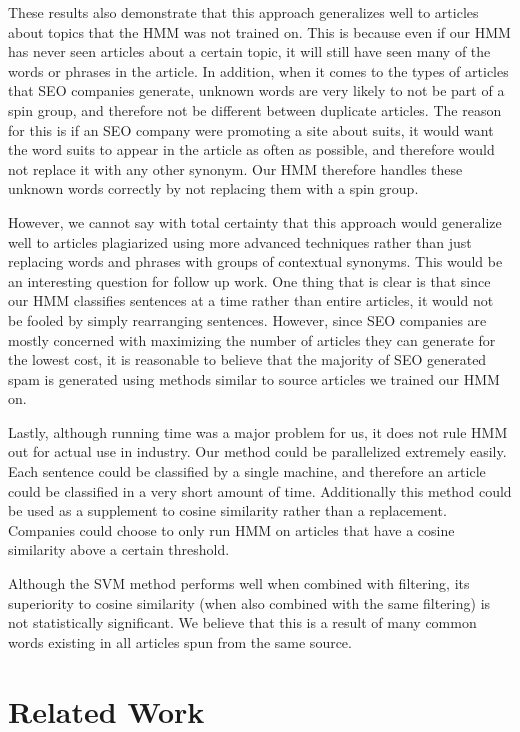 \documentclass[11pt,letterpaper,oneside, titlepage]{scrartcl}
\begin{document}
These results also demonstrate that this approach generalizes well to articles about topics that the HMM was not trained on. This is because even if our HMM has never seen articles about a certain topic, it will still have seen many of the words or phrases in the article. In addition, when it comes to the types of articles that SEO companies generate, unknown words are very likely to not be part of a spin group, and therefore not be different between duplicate articles. The reason for this is if an SEO company were promoting a site about suits, it would want the word suits to appear in the article as often as possible, and therefore would not replace it with any other synonym. Our HMM therefore handles these unknown words correctly by not replacing them with a spin group. 

However, we cannot say with total certainty that this approach would generalize well to articles plagiarized using more advanced techniques rather than just replacing words and phrases with groups of contextual synonyms. This would be an interesting question for follow up work. One thing that is clear is that since our HMM classifies sentences at a time rather than entire articles, it would not be fooled by simply rearranging sentences. However, since SEO companies are mostly concerned with maximizing the number of articles they can generate for the lowest cost, it is reasonable to believe that the majority of SEO generated spam is generated using methods similar to source articles we trained our HMM on.

Lastly, although running time was a major problem for us, it does not rule HMM out for actual use in industry. Our method could be parallelized extremely easily. Each sentence could be classified by a single machine, and therefore an article could be classified in a very short amount of time. Additionally this method could be used as a supplement to cosine similarity rather than a replacement. Companies could choose to only run HMM on articles that have a cosine similarity above a certain threshold.

Although the SVM method performs well when combined with filtering, its superiority to cosine similarity (when also combined with the same filtering) is not statistically significant.  We believe that this is a result of many common words existing in all articles spun from the same source.

\section{Related Work}
\end{document}
